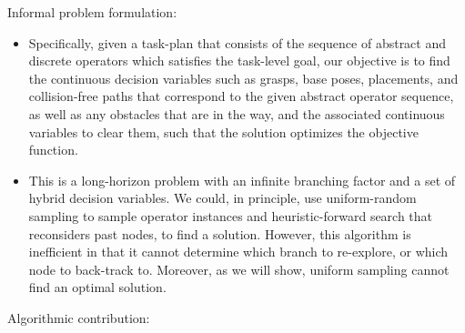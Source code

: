 \documentclass[10pt,letterpaper]{article}
\begin{document}
Informal problem formulation:
\begin{itemize}
\item Specifically, given a task-plan that consists of 
the sequence of abstract and discrete operators which
satisfies the task-level goal, our objective is to find the continuous 
decision variables such as grasps, base poses, placements, 
and collision-free paths that correspond to the given
abstract operator sequence, as well as any obstacles that are in the way, and
the associated continuous variables to clear them, such that the solution
optimizes the objective function.
\item This is a long-horizon problem with an infinite branching factor and a set
of hybrid decision variables. We
could, in principle, use uniform-random sampling to sample operator instances
and heuristic-forward search that reconsiders past nodes, 
to find a solution. However,
this algorithm is inefficient in that it cannot determine which branch to re-explore,
or which node to back-track to. Moreover, as we will show,
uniform sampling cannot find an optimal solution.
\end{itemize}
Algorithmic contribution:
\end{document}
